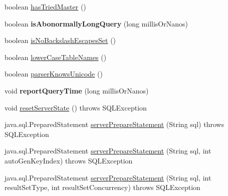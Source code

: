 \begin{DoxyCompactItemize}
\item 
boolean \mbox{\hyperlink{classcom_1_1mysql_1_1jdbc_1_1jdbc2_1_1optional_1_1_connection_wrapper_a81b35d775907ec47cd7d3b1007700939}{has\+Tried\+Master}} ()
\item 
\mbox{\label{classcom_1_1mysql_1_1jdbc_1_1jdbc2_1_1optional_1_1_connection_wrapper_ac090d3eecadff5ef65205a79b8eaa78c}} 
boolean {\bfseries is\+Abonormally\+Long\+Query} (long millis\+Or\+Nanos)
\item 
boolean \mbox{\hyperlink{classcom_1_1mysql_1_1jdbc_1_1jdbc2_1_1optional_1_1_connection_wrapper_a75f9e3be6db60cb253060986aac46e4c}{is\+No\+Backslash\+Escapes\+Set}} ()
\item 
boolean \mbox{\hyperlink{classcom_1_1mysql_1_1jdbc_1_1jdbc2_1_1optional_1_1_connection_wrapper_a1c95dda9f599a78aef9acb5cf854b99b}{lower\+Case\+Table\+Names}} ()
\item 
boolean \mbox{\hyperlink{classcom_1_1mysql_1_1jdbc_1_1jdbc2_1_1optional_1_1_connection_wrapper_a8e5f44787d05899d25927db0d43179e2}{parser\+Knows\+Unicode}} ()
\item 
\mbox{\label{classcom_1_1mysql_1_1jdbc_1_1jdbc2_1_1optional_1_1_connection_wrapper_adffeba4763fbb857fb86155431f17797}} 
void {\bfseries report\+Query\+Time} (long millis\+Or\+Nanos)
\item 
void \mbox{\hyperlink{classcom_1_1mysql_1_1jdbc_1_1jdbc2_1_1optional_1_1_connection_wrapper_af3edf0f2f10ef1647b70c9d54a9b7290}{reset\+Server\+State}} ()  throws S\+Q\+L\+Exception 
\item 
java.\+sql.\+Prepared\+Statement \mbox{\hyperlink{classcom_1_1mysql_1_1jdbc_1_1jdbc2_1_1optional_1_1_connection_wrapper_a75b41a04d4e8c60fd30e3ec13abccaa0}{server\+Prepare\+Statement}} (String sql)  throws S\+Q\+L\+Exception 
\item 
java.\+sql.\+Prepared\+Statement \mbox{\hyperlink{classcom_1_1mysql_1_1jdbc_1_1jdbc2_1_1optional_1_1_connection_wrapper_a83b5601387fe6a749d66a4c7a18315a4}{server\+Prepare\+Statement}} (String sql, int auto\+Gen\+Key\+Index)  throws S\+Q\+L\+Exception 
\item 
java.\+sql.\+Prepared\+Statement \mbox{\hyperlink{classcom_1_1mysql_1_1jdbc_1_1jdbc2_1_1optional_1_1_connection_wrapper_a46f978f9cb59c27e48921735fd605245}{server\+Prepare\+Statement}} (String sql, int result\+Set\+Type, int result\+Set\+Concurrency)  throws S\+Q\+L\+Exception 

\end{DoxyCompactItemize}
